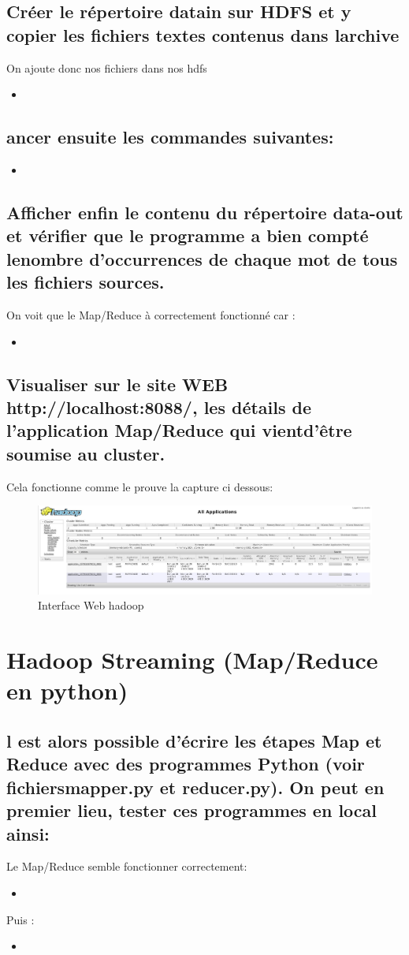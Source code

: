 \documentclass[10pt,a4paper]{article}
\newcommand{\insertcode}[2]{\begin{itemize}\item[]\end{itemize}}
\begin{document}
\subsection{Créer   le   répertoire  datain  sur   HDFS   et   y   copier   les   fichiers   textes   contenus   dans   larchive}
On ajoute donc nos fichiers dans nos hdfs
\insertcode{commande/9.txt}{Ajouts des fichiers}
\subsection{ancer ensuite les commandes suivantes:}
\insertcode{commande/10.txt}{Execution du Map/Reduce}
\subsection{Afficher enfin le contenu du répertoire  data-out  et vérifier que le programme a bien compté lenombre d’occurrences de chaque mot de tous les fichiers sources.}
On voit que le Map/Reduce à correctement fonctionné car : 
\insertcode{commande/11.txt}{resultat Map/reduce}
\subsection{Visualiser sur le site WEB http://localhost:8088/, les détails de l’application Map/Reduce qui vientd’être soumise au cluster.}
Cela fonctionne comme le prouve la capture ci dessous:
\begin{figure}[h!]
\centering
\includegraphics[scale=0.270]{image/3.jpg}
\caption{Interface Web hadoop }
\label{fig:net }
\end{figure}
\section{Hadoop Streaming (Map/Reduce en python)}
\subsection{l est alors possible d’écrire les étapes Map et Reduce avec des programmes Python (voir fichiersmapper.py et reducer.py). On peut en premier lieu, tester ces programmes en local ainsi:}
Le Map/Reduce semble fonctionner correctement:
\insertcode{commande/12.txt}{Map/Reduce python}
Puis :
\insertcode{commande/13.txt}{Vrai MAP/REDUCE}
\end{document}

